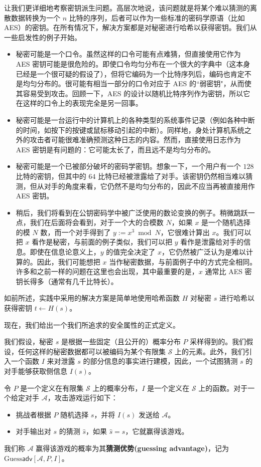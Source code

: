 让我们更详细地考察密钥派生问题。高层次地说，该问题就是将某个难以猜测的离散数据转换为一个 $n$ 比特的序列，后者可以作为一些标准的密码学原语（比如 AES）的密钥。在所有情况下，解决方案都是对秘密进行哈希以获得密钥。我们从一些启发性的例子开始。
\begin{itemize}
	\item 秘密可能是一个口令。虽然这样的口令可能有点难猜，但直接使用它作为 AES 密钥可能是很危险的。即使口令均匀分布在一个很大的字典中（这本身已经是一个很可疑的假设了），但将它编码为一个比特序列后，编码也肯定不是均匀分布的。很可能有相当一部分的口令对应于 AES 的``弱密钥"，从而使其容易受到攻击。回顾一下，AES 的设计以随机比特序列作为密钥，所以它在这样的口令上的表现完全是另一回事。
	\item 秘密可能是一台运行中的计算机上的各种类型的系统事件记录（例如各种中断的时间，如按下的按键或鼠标移动引起的中断）。同样地，身处计算机系统之外的攻击者可能很难准确预测这种日志的内容。然而，直接使用日志作为 AES 密钥是有问题的：它可能太长了，而且远不是均匀分布的。
	\item 秘密可能是一个已被部分破坏的密码学密钥。想象一下，一个用户有一个 $128$ 比特的密钥，但其中的 $64$ 比特已经被泄露给了对手。该密钥仍然相当难以猜测，但从对手的角度来看，它仍然不是均匀分布的，因此不应当再被直接用作 AES 密钥。
	\item 稍后，我们将看到在公钥密码学中被广泛使用的数论变换的例子。稍微跳跃一点，我们在后面将会看到，对于一个大的合模数 $N$，如果 $x$ 是一个随机选择的模 $N$ 数，而一个对手得到了 $y:=x^3 \bmod N$，它很难计算出 $x$。我们可以把 $x$ 看作是秘密，与前面的例子类似，我们可以把 $y$ 看作是泄露给对手的信息。即使在信息论意义上，$y$ 的值完全决定了 $x$，它仍然被广泛认为是难以计算的。因此，我们可能想把 $x$ 当作秘密数据，与前面例子中的方式完全相同。许多和之前一样的问题在这里也会出现，其中最重要的是，$x$ 通常比 AES 密钥长得多（通常有几千比特长）。
\end{itemize}

如前所述，实践中采用的解决方案是简单地使用哈希函数 $H$ 对秘密 $s$ 进行哈希以获得密钥 $t\leftarrow H(s)$。

现在，我们给出一个我们所追求的安全属性的正式定义。

我们假设，秘密 $s$ 是根据一些固定（且公开的）概率分布 $P$ 采样得到的。我们假设，任何这样的秘密数据都可以被编码为某个有限集 $\mathcal{S}$ 上的元素。此外，我们引入一个函数 $I$ 来对泄露 $s$ 的部分信息的事实进行建模，因此，一个试图猜测 $s$ 的对手能够获取侧信息 $I(s)$。

\begin{game}[猜测优势]\label{game:8-3}
令 $P$ 是一个定义在有限集 $\mathcal{S}$ 上的概率分布，$I$ 是一个定义在 $\mathcal{S}$ 上的函数。对于一个给定对手 $\mathcal{A}$，攻击游戏运行如下：
\begin{itemize}
	\item 挑战者根据 $P$ 随机选择 $s$，并将 $I(s)$ 发送给 $\mathcal{A}$。
	\item 对手输出对 $s$ 的猜测 $\hat{s}$，如果 $\hat{s}=s$，它就赢得该游戏。
\end{itemize}
我们称 $\mathcal{A}$ 赢得该游戏的概率为其\textbf{猜测优势(guessing advantage)}，记为 $\mathrm{Guess}\mathsf{adv}[\mathcal{A},P,I]$。
\end{game}

